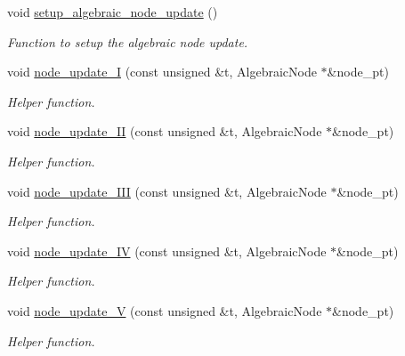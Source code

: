 \begin{DoxyCompactItemize}
\item 
void \hyperlink{classoomph_1_1AlgebraicCylinderWithFlagMesh_ad6af2e420e0f152a7fb055f25400a5d0}{setup\+\_\+algebraic\+\_\+node\+\_\+update} ()
\begin{DoxyCompactList}\small\item\em Function to setup the algebraic node update. \end{DoxyCompactList}\item 
void \hyperlink{classoomph_1_1AlgebraicCylinderWithFlagMesh_a713cf7c2e1be91eae2667dc3e1fd8644}{node\+\_\+update\+\_\+I} (const unsigned \&t, Algebraic\+Node $\ast$\&node\+\_\+pt)
\begin{DoxyCompactList}\small\item\em Helper function. \end{DoxyCompactList}\item 
void \hyperlink{classoomph_1_1AlgebraicCylinderWithFlagMesh_a2717b4ae70a9641c24becc8176410b3e}{node\+\_\+update\+\_\+\+II} (const unsigned \&t, Algebraic\+Node $\ast$\&node\+\_\+pt)
\begin{DoxyCompactList}\small\item\em Helper function. \end{DoxyCompactList}\item 
void \hyperlink{classoomph_1_1AlgebraicCylinderWithFlagMesh_a3e8c71cc3ab123864b4f999e612345ee}{node\+\_\+update\+\_\+\+I\+II} (const unsigned \&t, Algebraic\+Node $\ast$\&node\+\_\+pt)
\begin{DoxyCompactList}\small\item\em Helper function. \end{DoxyCompactList}\item 
void \hyperlink{classoomph_1_1AlgebraicCylinderWithFlagMesh_a69ab465aa28dd9a65a0c50762c0a6d89}{node\+\_\+update\+\_\+\+IV} (const unsigned \&t, Algebraic\+Node $\ast$\&node\+\_\+pt)
\begin{DoxyCompactList}\small\item\em Helper function. \end{DoxyCompactList}\item 
void \hyperlink{classoomph_1_1AlgebraicCylinderWithFlagMesh_a035216f13c9758881ce2b7e33ad27926}{node\+\_\+update\+\_\+V} (const unsigned \&t, Algebraic\+Node $\ast$\&node\+\_\+pt)
\begin{DoxyCompactList}\small\item\em Helper function. \end{DoxyCompactList}\item 

\end{DoxyCompactItemize}
